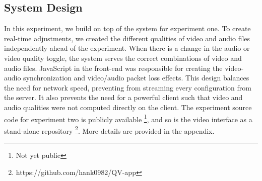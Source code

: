\subsection{System Design}
In this experiment, we build on top of the system for experiment one. To create real-time adjustments, we created the different qualities of video and audio files independently ahead of the experiment. When there is a change in the audio or video quality toggle, the system serves the correct combinations of video and audio files. JavaScript in the front-end was responsible for creating the video-audio synchronization and video/audio packet loss effects.
This design balances the need for network speed, preventing from streaming every configuration from the server. It also prevents the need for a powerful client such that video and audio qualities were not computed directly on the client. The experiment source code for experiment two is publicly available \footnote{Not yet public}, and so is the video interface as a stand-alone repository \footnote{https://github.com/hank0982/QV-app}. More details are provided in the appendix.